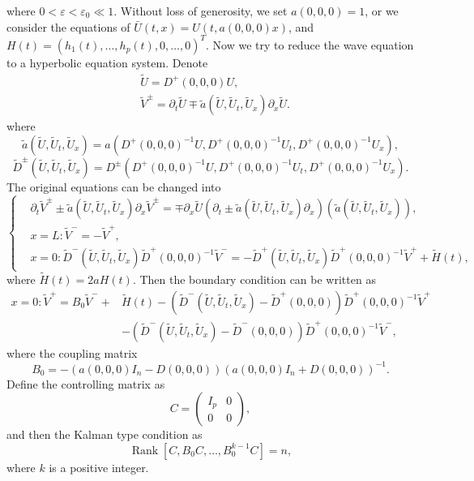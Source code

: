 \documentclass[a4paper,reqno,11pt]{amsart}
\numberwithin{equation}{section} %
\begin{document}
where $0 < \varepsilon < \varepsilon _0 \ll 1$.
Without loss of generosity, we set $a(0,0,0)=1$, or we consider the equations of $\bar{U}\left( t,x \right) =U\left( t,a\left( 0,0,0 \right) x \right) $, and $H(t)=\left(h_1(t), \ldots, h_p(t), 0, \ldots, 0\right)^T$. Now we try to reduce the wave equation to a hyperbolic equation system. Denote
$$
\begin{aligned}
& \tilde{U}=D^{+}(0,0,0) U ,\\
& \tilde{V}^{\pm}=\partial_t \tilde{U} \mp \tilde{a} \left(\tilde{U}, \tilde{U}_t, \tilde{U}_x\right) \partial_x \tilde{U}.
\end{aligned}
$$
where
$$
\tilde{a} \left(\tilde{U} , \tilde{U} _t, \tilde{U} _x\right)=a\left(D^{+}(0,0,0)^{-1} U, D^{+}(0,0,0)^{-1} U_t, D^{+}(0,0,0)^{-1} U_x\right) ,
$$
$$
\tilde{D} ^{\pm}\left(\tilde{U} , \tilde{U} _t, \tilde{U} _x\right)=D^{\pm}\left(D^{+}(0,0,0)^{-1} U, D^{+}(0,0,0)^{-1} U_t, D^{+}(0,0,0)^{-1} U_x\right) .
$$
The original equations can be changed into
\begin{equation}\label{hyperbolic equations}
    \begin{cases}
    & \partial_t \tilde{V} ^{ \pm} \pm \tilde{a} \left(\tilde{U} , \tilde{U} _t, \tilde{U} _x\right) \partial_x \tilde{V} ^{ \pm}=\mp \partial_x \tilde{U} \left(\partial_t \pm \tilde{a} \left(\tilde{U} , \tilde{U} _t, \tilde{U} _x\right) \partial_x\right)\left(\tilde{a} \left(\tilde{U} , \tilde{U} _t, \tilde{U} _x\right)\right) ,\\
    & x=L:\tilde{ V} ^{-}=-\tilde{V} ^{+} ,\\
    & x=0: \tilde{D} ^{-}\left(\tilde{U} , \tilde{U} _t, \tilde{U} _x\right) \tilde{D} ^{+}(0,0,0)^{-1} \tilde{V} ^{-}=-\tilde{D} ^{+}\left(\tilde{U} , \tilde{U} _t, \tilde{U} _x\right) \tilde{D} ^{+}(0,0,0)^{-1} \tilde{V} ^{+}+\tilde{H} (t),
\end{cases}
\end{equation}
where $\tilde{H} (t)=2aH(t)$. Then the boundary condition can be written as
$$
\begin{aligned}
x=0: \widetilde{V}^{+}=B_0 \widetilde{V}^{-}+ & \widetilde{H}(t)-\left(\widetilde{D}^{-}\left(\widetilde{U}, \widetilde{U}_t, \widetilde{U}_x\right)-\widetilde{D}^{+}(0,0,0)\right) \widetilde{D}^{+}(0,0,0)^{-1} \widetilde{V}^{+} \\
& -\left(\widetilde{D}^{-}\left(\widetilde{U}, \widetilde{U}_t, \widetilde{U}_x\right)-\widetilde{D}^{-}(0,0,0)\right) \widetilde{D}^{+}(0,0,0)^{-1} \widetilde{V}^{-},
\end{aligned}
$$
where the coupling matrix 
$$
B_0=-\left(a(0,0,0) I_n-D(0,0,0)\right)\left(a(0,0,0) I_n+D(0,0,0)\right)^{-1} .
$$
Define the controlling matrix as 
$$
C=\left(\begin{array}{cc}
I_p & 0 \\
0 & 0
\end{array}\right) ,
$$
and then the Kalman type condition as
\begin{equation}\label{41}
    \operatorname{Rank}\left[C, B_0 C, \ldots, B_0^{k-1} C\right]=n,
\end{equation}
where $k$ is a positive integer.
\end{document}
